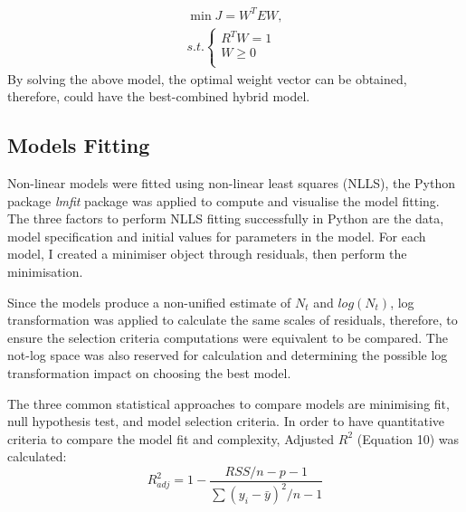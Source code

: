 \documentclass[a4paper]{report}
\begin{document}
\begin{linenumbers}
        \begin{equation}
            \begin{split}
            \min J=W^TEW,
            \\
            s.t.\left\{ \begin{array}{l}
            R^TW=1\\
            W\geq 0\\
            \end{array} \right.
            \end{split}
            \label{Weigh vector}
        \end{equation}
        By solving the above model, the optimal weight vector can be obtained, therefore, could have the best-combined hybrid model.
        
        \subsection{Models Fitting}
        Non-linear models were fitted using non-linear least squares (NLLS), the Python package \emph{lmfit} package \citep{matt_newville_2022_7370358} was applied to compute and visualise the model fitting. The three factors to perform NLLS fitting successfully in Python are the data, model specification and initial values for parameters in the model.  For each model, I created a minimiser object through residuals, then perform the minimisation. 
        
        Since the models produce a non-unified estimate of $N_t$ and $log(N_t)$, log transformation was applied to calculate the same scales of residuals, therefore, to ensure the selection criteria computations were equivalent to be compared. The not-log space was also reserved for calculation and determining the possible log transformation impact on choosing the best model.

        The three common statistical approaches to compare models are minimising fit, null hypothesis test, and model selection criteria. In order to have quantitative criteria to compare the model fit and complexity, Adjusted $R^2$ (Equation 10) was calculated: 
        \begin{equation}
                R_{adj}^{2} = 1 - \frac{RSS/n - p - 1}{\sum(y_{i} - \bar{y})^{2}/n - 1}
                \label{eq:R^2}
        \end{equation}        
        

\end{linenumbers}
\end{document}
